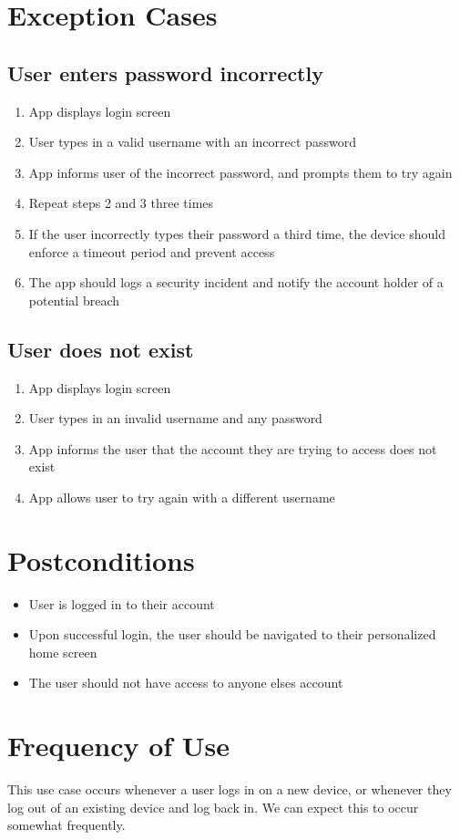 \documentclass{article}
\begin{document}
\section{Exception Cases}
	\subsection{User enters password incorrectly}
		\begin{enumerate}
			\item App displays login screen
			\item User types in a valid username with an incorrect password
			\item App informs user of the incorrect password, and prompts them to try again
			\item Repeat steps 2 and 3 three times
			\item If the user incorrectly types their password a third time, the device should enforce a timeout period and prevent access
			\item The app should logs a security incident and notify the account holder of a potential breach
		\end{enumerate}
	\subsection{User does not exist}
	\begin{enumerate}
		\item App displays login screen
		\item User types in an invalid username and any password
		\item App informs the user that the account they are trying to access does not exist
		\item App allows user to try again with a different username
	\end{enumerate}
\section{Postconditions}
\begin{itemize}
	\item User is logged in to their account
	\item Upon successful login, the user should be navigated to their personalized home screen
	\item The user should not have access to anyone elses account
\end{itemize}

\section{Frequency of Use}
This use case occurs whenever a user logs in on a new device, or whenever they log out of an existing device and log back in. We can expect this to occur somewhat frequently.
\end{document}
